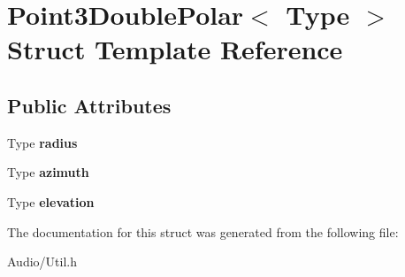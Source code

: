 \hypertarget{struct_point3_double_polar}{}\section{Point3\+Double\+Polar$<$ Type $>$ Struct Template Reference}
\label{struct_point3_double_polar}
\subsection*{Public Attributes}
\begin{DoxyCompactItemize}
\item 
\mbox{\label{struct_point3_double_polar_a35dbac7aa7eb5fb2f2f67599e4e88be1}} 
Type {\bfseries radius}
\item 
\mbox{\label{struct_point3_double_polar_abec0c9bee287bb80828a886577d82bdd}} 
Type {\bfseries azimuth}
\item 
\mbox{\label{struct_point3_double_polar_a3c9719e27561b0d80f8b0b68e0d4a0ec}} 
Type {\bfseries elevation}
\end{DoxyCompactItemize}


The documentation for this struct was generated from the following file\+:\begin{DoxyCompactItemize}
\item 
Audio/Util.\+h\end{DoxyCompactItemize}
